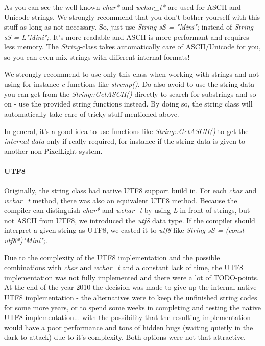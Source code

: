 As you can see the well known \emph{char*} and \emph{wchar\_t*} are used for \ac{ASCII} and Unicode strings. We strongly recommend that you don't bother yourself with this stuff as long as not necessary. So, just use \emph{String sS = "Mini";} instead of \emph{String sS = L"Mini";}. It's more readable and \ac{ASCII} is more performant and requires less memory. The \emph{String}-class takes automatically care of \ac{ASCII}/Unicode for you, so you can even mix strings with different internal formats!

We strongly recommend to use only this class when working with strings and not using for instance \emph{c}-functions like \emph{strcmp()}. Do also avoid to use the string data you can get from the \emph{String::GetASCII()} directly to search for substrings and so on - use the provided string functions instead. By doing so, the string class will automatically take care of tricky stuff mentioned above.

In general, it's a good idea to use functions like \emph{String::GetASCII()} to get the \emph{internal data} only if really required, for instance if the string data is given to another non PixelLight system.


\paragraph{UTF8}
Originally, the string class had native UTF8 support build in. For each \emph{char} and \emph{wchar\_t} method, there was also an equivalent UTF8 method. Because the compiler can distinguish \emph{char*} and \emph{wchar\_t} by using \emph{L} in front of strings, but not \ac{ASCII} from UTF8, we introduced the \emph{utf8} data type. If the compiler should interpret a given string as UTF8, we casted it to \emph{utf8} like \emph{String sS = (const utf8*)"Mini";}.

Due to the complexity of the UTF8 implementation and the possible combinations with \emph{char} and \emph{wchar\_t} and a constant lack of time, the UTF8 implementation was not fully implemented and there were a lot of TODO-points. At the end of the year 2010 the decision was made to give up the internal native UTF8 implementation - the alternatives were to keep the unfinished string codes for some more years, or to spend some weeks in completing and testing the native UTF8 implementation... with the possibility that the resulting implementation would have a poor performance and tons of hidden bugs (waiting quietly in the dark to attack) due to it's complexity. Both options were not that attractive.

